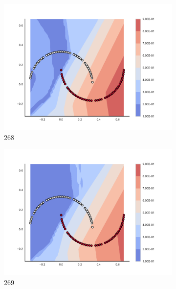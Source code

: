 \begin{figure}[h]
\begin{subfigure}[b]{0.09\textwidth}
    \includegraphics[clip, trim=2.35cm 1.75cm 4.5cm 0cm,width=\textwidth]{img/convergence/268.pdf}
    \caption{268}
    \label{fig:convergence_268}
\end{subfigure}
%
\begin{subfigure}[b]{0.09\textwidth}
    \includegraphics[clip, trim=2.35cm 1.75cm 4.5cm 0cm,width=\textwidth]{img/convergence/269.pdf}
    \caption{269}
    \label{fig:convergence_269}
\end{subfigure}
%
\begin{subfigure}[b]{0.09\textwidth}

\end{subfigure}
\end{figure}

